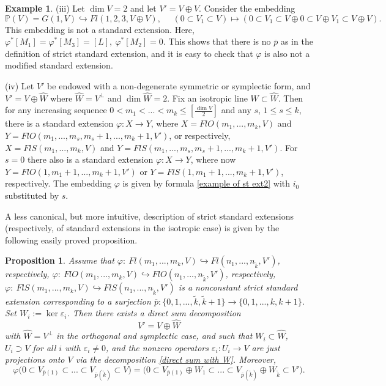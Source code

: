 \documentclass[12pt]{amsart}
\renewcommand{\phi}{\varphi}
\newtheorem{proposition}[theorem]{Proposition}
\theoremstyle{definition}
\newtheorem{example}[theorem]{Example}
\begin{document}
\begin{example}
(iii) Let $\dim V=2$ and let $V'=V\oplus V$. Consider the 
embedding
$$
\mathbb{P}(V)=G(1,V)\hookrightarrow Fl(1,2,3,V\oplus V),\ \ \ 
\ \ \ (0\subset V_1\subset V)\mapsto(0\subset V_1\subset 
V\oplus0\subset V\oplus V_1\subset V\oplus V).
$$
This embedding is not a standard extension. Here, $\varphi^*[
M_1]=\varphi^*[M_3]=[L],\ \varphi^*[M_2]=0.$ This shows that 
there is no $\overline{p}$ as in the definition of strict standard 
extension, and it is easy to check that $\phi$ is also not a 
modified standard extension.
\end{example}

(iv) Let $V'$ be endowed with a non-degenerate symmetric or
symplectic form, and $V'=V\oplus\widehat{W}$ where $\widehat{W}
=V^{\bot}$ and $\dim\widehat{W}=2$. Fix an isotropic line $W
\subset\widehat{W}$. Then for any increasing sequence $0<m_1<
...<m_k\le[\frac{\dim V}{2}]$ and any $s$, $1\le s\le k$, 
there is a standard extension $\phi:X\to Y$, where $X=FlO(m_1,
...,m_k,V)$ and $Y=FlO(m_1,...,m_s,m_s+1,...,m_k+1,V')$, or 
respectively, $X=FlS(m_1,...,m_k,V)$ and $Y=FlS(m_1,...,m_s,
m_s+1,...,m_k+1,V')$. For $s=0$ there also is a standard 
extension $\phi:X\to Y$, where now $Y=FlO(1,m_1+1,...,m_k+1,V'
)$ or $Y=FlS(1,m_1+1,...,m_k+1,V')$, respectively. The 
embedding $\phi$ is given by formula \eqref{example of st ext2}
with $i_0$ substituted by $s$.

\vspace{3mm}
A less canonical, but more intuitive, description of strict 
standard extensions (respectively, of standard extensions in 
the isotropic case) is given by the following easily proved 
proposition.
\begin{proposition}\label{descrn of st ext}
Assume that $\varphi:\ Fl(m_1,...,m_k,V)\hookrightarrow 
Fl(n_1,...,n_{\tilde{k}},V')$, respectively, $\varphi:\ 
FlO(m_1,...,m_k,V)\hookrightarrow FlO(n_1,...,n_{\tilde{k}},
V')$, respectively, $\varphi:\ FlS(m_1,...,m_k,V)
\hookrightarrow FlS(n_1,...,n_{\tilde{k}},V')$ is a 
nonconstant strict standard extension corresponding to a surjection $\overline{p}:\{0,1,...,\tilde{k},\tilde{k}+1\}\to
\{0,1,...,k,k+1\}$. 
Set $W_i:=\ker\varepsilon_i$. Then there exists a 
direct sum decomposition 
\begin{equation}\label{direct sum with W}
V'=V\oplus \widehat{W}
\end{equation}
with $\widehat{W}=V^{\bot}$ in the orthogonal and symplectic 
case, and such that $W_i\subset \widehat{W}$, $U_i\supset V$ 
for all $i$ with $\varepsilon_i\ne0$, and the nonzero 
operators $\varepsilon_i:U_i\to V$ are just projections onto 
$V$ via the decomposition \eqref{direct sum with W}. Moreover,
\begin{equation}\label{phi(...)1}
\varphi\big(0\subset V_{\overline{p}(1)}\subset...\subset 
V_{\overline{p}(\tilde{k})}\subset V\big)=
\big(0\subset V_{\overline{p}(1)}\oplus W_1\subset...\subset 
V_{\overline{p}(\tilde{k})}\oplus W_{\tilde{k}}\subset V'\big).
\end{equation} 
\end{proposition}
\end{document}
